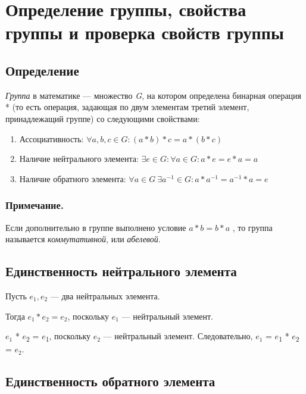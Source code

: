 \documentclass[12pt]{article}
\begin{document}
    \section{Определение группы, свойства группы и проверка свойств группы}

    \subsection{Определение}
    \emph{Группа} в математике --- множество \emph{G}, на котором определена
    бинарная операция * (то есть операция, задающая по двум элементам третий
    элемент, принадлежащий группе) со следующими свойствами:

    \begin{enumerate}
        \item
              Ассоциативность: $\forall a, b, c \in G: (a * b) * c = a * (b * c)$

        \item
              Наличие нейтрального элемента: $\exists e \in G : \forall a \in G: a * e = e * a = a$

        \item
              Наличие обратного элемента: $\forall a \in G \ \exists a^{−1}\in G: a * a^{−1} = a^{−1} * a = e$
    \end{enumerate}

    \subsubsection{Примечание.}

    Если дополнительно в группе выполнено условие $a * b = b * a$ , то группа
    называется \emph{коммутативной}, или \emph{абелевой}.

    \subsection{Единственность нейтрального элемента}

    Пусть $e_{1}, e_{2}$ --- два нейтральных элемента.

    Тогда $e_{1} * e_{2} = e_{2}$, поскольку $e_{1}$ --- нейтральный элемент.

    $e_{1}$ * $e$\textsubscript{2} = $e$\textsubscript{1}, поскольку
    $e_{2}$ --- нейтральный элемент. Следовательно,
    $e_{1}$ = $e$\textsubscript{1} * $e$\textsubscript{2} =
    $e_{2}$.

    \subsection{Единственность обратного
        элемента}
\end{document}
